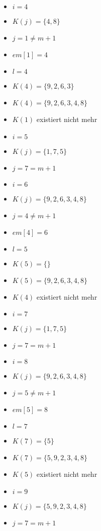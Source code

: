 \documentclass[a4paper,10pt]{article}
\begin{document}
\begin{enumerate}
\begin{itemize}
			\item	$i = 4$
			\item	$K(j) = \{4,8\}$
			\item	$j = 1 \neq m+1$
			\item	$em[1] = 4$
			\item	$l = 4$
			\item	$K(4) = \{9,2,6,3\}$
			\item	$K(4) = \{9,2,6,3,4,8\}$
			\item	$K(1)$ existiert nicht mehr
			\item	$i = 5$
			\item	$K(j) = \{1,7,5\}$
			\item	$j = 7 = m+1$
			\item	$i = 6$
			\item	$K(j) = \{9,2,6,3,4,8\}$
			\item	$j = 4 \neq m+1$
			\item	$em[4] = 6$
			\item	$l = 5$
			\item	$K(5) = \{\}$
			\item	$K(5) = \{9,2,6,3,4,8\}$
			\item	$K(4)$ existiert nicht mehr
			\item	$i = 7$
			\item	$K(j) = \{1,7,5\}$
			\item	$j = 7 = m+1$
			\item	$i = 8$
			\item	$K(j) = \{9,2,6,3,4,8\}$
			\item	$j = 5 \neq m+1$
			\item	$em[5] = 8$
			\item	$l = 7$
			\item	$K(7) = \{5\}$
			\item	$K(7) = \{5,9,2,3,4,8\}$
			\item	$K(5)$ existiert nicht mehr
			\item	$i = 9$
			\item	$K(j) = \{5,9,2,3,4,8\}$
			\item	$j = 7 = m+1$
		\end{itemize}
\end{enumerate}
\end{document}
